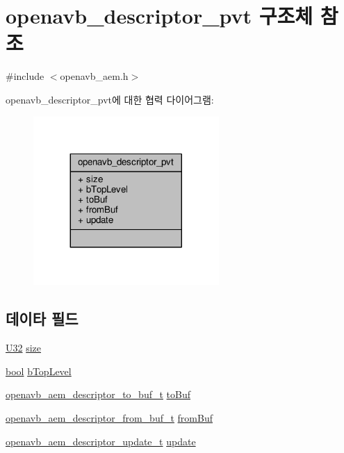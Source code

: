 \hypertarget{structopenavb__descriptor__pvt}{}\section{openavb\+\_\+descriptor\+\_\+pvt 구조체 참조}
\label{structopenavb__descriptor__pvt}


{\ttfamily \#include $<$openavb\+\_\+aem.\+h$>$}



openavb\+\_\+descriptor\+\_\+pvt에 대한 협력 다이어그램\+:
\nopagebreak
\begin{figure}[H]
\begin{center}
\leavevmode
\includegraphics[width=200pt]{structopenavb__descriptor__pvt__coll__graph}
\end{center}
\end{figure}
\subsection*{데이타 필드}
\begin{DoxyCompactItemize}
\item 
\hyperlink{openavb__types__base__pub_8h_a696390429f2f3b644bde8d0322a24124}{U32} \hyperlink{structopenavb__descriptor__pvt_a48d1688d27e52f04e303777351a4779a}{size}
\item 
\hyperlink{avb__gptp_8h_af6a258d8f3ee5206d682d799316314b1}{bool} \hyperlink{structopenavb__descriptor__pvt_ad805028b95b0f83445d688c1fe4f6d05}{b\+Top\+Level}
\item 
\hyperlink{openavb__aem_8h_ae65093a6026bb7cdc6e20a9811d2702a}{openavb\+\_\+aem\+\_\+descriptor\+\_\+to\+\_\+buf\+\_\+t} \hyperlink{structopenavb__descriptor__pvt_a7a025a3804f70d8776e39e69c277300c}{to\+Buf}
\item 
\hyperlink{openavb__aem_8h_a85dd36466adfe9947beaa1f5f9f9fb03}{openavb\+\_\+aem\+\_\+descriptor\+\_\+from\+\_\+buf\+\_\+t} \hyperlink{structopenavb__descriptor__pvt_a878fe548a92bbc11fe864b6852d029ef}{from\+Buf}
\item 
\hyperlink{openavb__aem_8h_af8704d1f8eb7ce178498444891752f83}{openavb\+\_\+aem\+\_\+descriptor\+\_\+update\+\_\+t} \hyperlink{structopenavb__descriptor__pvt_a798693967df3e47c6418fb2a42ad6e43}{update}
\end{DoxyCompactItemize}


